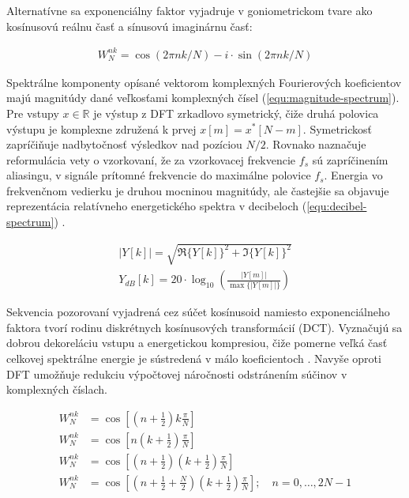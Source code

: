 Alternatívne sa exponenciálny faktor vyjadruje v goniometrickom tvare ako kosínusovú reálnu časť a sínusovú imaginárnu časť:
\begin{ceqn}\begin{align}
W_{N}^{nk} = \cos(2\pi nk/ N) - i \cdot \sin(2\pi nk/ N)
\end{align}\end{ceqn}

Spektrálne komponenty opísané vektorom komplexných Fourierových koeficientov majú magnitúdy dané veľkosťami komplexných čísel
(\ref{equ:magnitude-spectrum}). Pre vstupy $x \in \mathbb{R}$ je výstup z DFT zrkadlovo symetrický, čiže druhá polovica
výstupu je komplexne združená k prvej $x[m] = x^{*}[N - m]$. Symetrickosť zapríčiňuje nadbytočnosť výsledkov
nad pozíciou  $N/2$. Rovnako naznačuje reformulácia vety o vzorkovaní, že za vzorkovacej frekvencie $f_s$ sú zapríčinením aliasingu, v signále prítomné frekvencie do maximálne polovice $f_s$. Energia vo frekvenčnom vedierku je druhou mocninou magnitúdy, ale častejšie sa
objavuje reprezentácia relatívneho energetického spektra v decibeloch (\ref{equ:decibel-spectrum}) \cite{understanding-dsp}.
\begin{ceqn}\begin{align}
|Y[k]| = \sqrt{\Re\{Y[k]\}^2 + \Im\{Y[k]\}^2} \label{equ:magnitude-spectrum} \\
Y_{dB}[k] = 20 \cdot \log_{10}{ \left( \frac{|Y[m]|}{\max\{|Y[m]|\}} \right)} \label{equ:decibel-spectrum}
\end{align}\end{ceqn}

Sekvencia pozorovaní vyjadrená cez súčet kosínusoid namiesto exponenciálneho faktora tvorí rodinu diskrétnych
kosínusových transformácií (DCT). Vyznačujú sa dobrou dekoreláciu vstupu a energetickou kompresiou, čiže pomerne veľká
časť celkovej spektrálne energie je sústredená v málo koeficientoch \cite{dct-applications}. Navyše oproti DFT umožňuje redukciu
výpočtovej náročnosti odstránením súčinov v komplexných číslach.

\begin{ceqn}\begin{align}
\tag{DCT-II} W_{N}^{nk} &= \cos{\left[\left(n + \frac{1}{2}\right) k\frac{\pi}{N}\right]} \\
\tag{DCT-III} W_{N}^{nk} &= \cos{\left[n \left(k + \frac{1}{2} \right) \frac{\pi}{N}\right]}  \\
\tag{DCT-IV} W_{N}^{nk} &= \cos{\left[\left(n + \frac{1}{2} \right) \left(k + \frac{1}{2} \right) \frac{\pi}{N} \right]} \\
\tag{MDCT} W_{N}^{nk} &= \cos{\left[\left(n + \frac{1}{2} + \frac{N}{2} \right) \left(k + \frac{1}{2} \right) \frac{\pi}{N} \right]};\quad n = 0, \dots, 2N - 1
\end{align}\end{ceqn}

